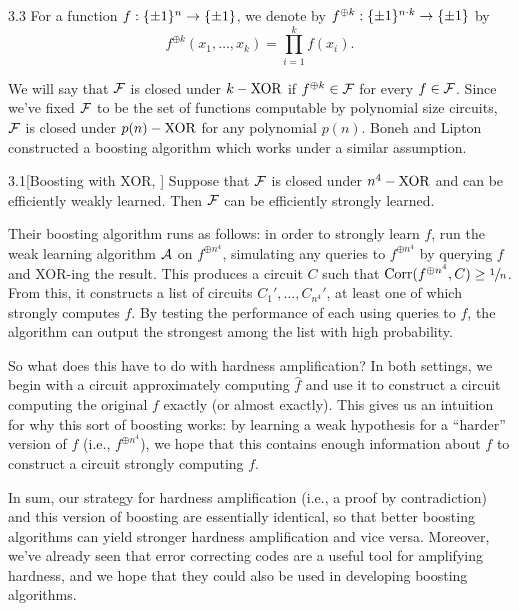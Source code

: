 \documentclass[11pt]{article}
\begin{document}
\begin{definition}{3.3}
    For a function $f : \{\pm 1\}^n \rightarrow \{\pm 1\}$, we denote by $f^{\oplus k} : \{\pm 1\}^{n \cdot k} \rightarrow \{\pm 1\}$ by 
    \begin{equation*}
        f^{\oplus k}(x_1, \ldots, x_k) = \prod_{i = 1}^{k} f(x_i).
    \end{equation*}
\end{definition}

We will say that $\mathcal{F}$ is closed under $k-\textup{XOR}$ if $f^{\oplus k} \in \mathcal{F}$ for every $f \in \mathcal{F}$. Since we've fixed $\mathcal{F}$ to be the set of functions computable by polynomial size circuits, $\mathcal{F}$ is closed under $p(n)-\textup{XOR}$ for any polynomial $p(n)$. Boneh and Lipton \cite{BonehLipton} constructed a boosting algorithm which works under a similar assumption.

\begin{theorem}{3.1}[Boosting with XOR, \cite{BonehLipton}]\label{t-3-1}
    Suppose that $\mathcal{F}$ is closed under $n^4-\textup{XOR}$ and can be efficiently weakly learned. Then $\mathcal{F}$ can be efficiently strongly learned.
\end{theorem}

Their boosting algorithm runs as follows: in order to strongly learn $f$, run the weak learning algorithm $\mathcal{A}$ on $f^{\oplus n^4}$, simulating any queries to $f^{\oplus n^4}$ by querying $f$ and XOR-ing the result. This produces a circuit $C$ such that $\mathrm{Corr}(f^{\oplus n^4}, C) \geq \sfrac{1}{n}$. From this, it constructs a list of circuits $C_1', \ldots, C_{n^4}'$, at least one of which strongly computes $f$. By testing the performance of each using queries to $f$, the algorithm can output the strongest among the list with high probability.

So what does this have to do with hardness amplification? In both settings, we begin with a circuit approximately computing $\hat{f}$ and use it to construct a circuit computing the original $f$ exactly (or almost exactly). This gives us an intuition for why this sort of boosting works: by learning a weak hypothesis for a ``harder'' version of $f$ (i.e., $f^{\oplus n^4}$), we hope that this contains enough information about $f$ to construct a circuit strongly computing $f$. 

In sum, our strategy for hardness amplification (i.e., a proof by contradiction) and this version of boosting are essentially identical, so that better boosting algorithms can yield stronger hardness amplification and vice versa. Moreover, we've already seen that error correcting codes are a useful tool for amplifying hardness, and we hope that they could also be used in developing boosting algorithms.
\end{document}

